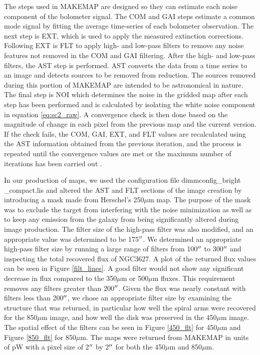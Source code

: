 The steps used in MAKEMAP are designed so they can estimate each noise component of the bolometer signal.  The COM and GAI steps estimate a common mode signal by fitting the average time-series of each bolometer observation.  The next step is EXT, which is used to apply the measured extinction corrections.  Following EXT is FLT to apply high- and low-pass filters to remove any noise features not removed in the COM and GAI filtering.  After the high- and low-pass filters, the AST step is performed.  AST converts the data from a time series to an image and detects sources to be removed from reduction.  The sources removed during this portion of MAKEMAP are intended to be astronomical in nature.  The final step is NOI which determines the noise in the gridded map after each step has been performed and is calculated by isolating the white noise component in equation \ref{eq:sc2_raw}.  A convergence check is then done based on the magnitude of change in each pixel from the previous map and the current version.  If the check fails, the COM, GAI, EXT, and FLT values are recalculated using the AST information obtained from the previous iteration, and the process is repeated until the convergence values are met or the maximum number of iterations has been carried out \citep{chapin2013}.

In our production of maps, we used the configuration file dimmconfig\_bright \_compact.lis and altered the AST and FLT sections of the image creation by introducing a mask made from Herschel's 250$\mu$m map.  The purpose of the mask was to exclude the target from interfering with the noise minimization as well as to keep any emission from the galaxy from being significantly altered during image production.  The filter size of the high-pass filter was also modified, and an appropriate value was determined to be 175$\mbox{$^{\prime\prime}$}$.  We determined an appropriate high-pass filter size by running a large range of filters from 100$\mbox{$^{\prime\prime}$}$ to 300$\mbox{$^{\prime\prime}$}$ and inspecting the total recovered flux of NGC3627.  A plot of the returned flux values can be seen in Figure \ref{filt_lines}.  A good filter would not show any significant decrease in flux compared to the 350$\mu$m or 500$\mu$m fluxes.  This requirement removes any filters greater than 200$\mbox{$^{\prime\prime}$}$.  Given the flux was nearly constant with filters less than 200$\mbox{$^{\prime\prime}$}$, we chose an appropriate filter size by examining the structure that was returned, in particular how well the spiral arms were recovered for the 850$\mu$m image, and how well the disk was preserved in the 450$\mu$m image.  The spatial effect of the filters can be seen in Figure \ref{450_flt} for 450$\mu$m and Figure \ref{850_flt} for 850$\mu$m.  The maps were returned from MAKEMAP in units of pW with a pixel size of 2$\mbox{$^{\prime\prime}$}$ by 2$\mbox{$^{\prime\prime}$}$ for both the 450$\mu$m and 850$\mu$m.


